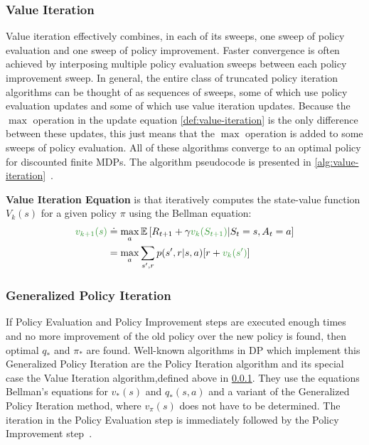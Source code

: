 \documentclass[../xlapes02]{subfiles}
\begin{document}
    \subsubsection{Value Iteration}\label{subsubsec:value-iteration}
    Value iteration effectively combines, in each of its sweeps, one sweep of policy evaluation and one sweep of policy improvement. Faster convergence is often achieved by interposing multiple policy evaluation sweeps between each policy improvement sweep. In general, the entire class of truncated policy iteration algorithms can be thought of as sequences of sweeps, some of which use policy evaluation updates and some of which use value iteration updates. Because the $\max$ operation in the update equation \cref{def:value-iteration} is the only difference between these updates, this just means that the $\max$ operation is added to some sweeps of policy evaluation. All of these algorithms converge to an optimal policy for discounted finite MDPs. The algorithm pseudocode is presented in \cref{alg:value-iteration}~\cite{sutton2018reinforcement}.

    \begin{definition}
        \label{def:value-iteration}
        \textbf{Value Iteration Equation} is that iteratively computes the state-value function $V_k(s)$ for a given policy $\pi$ using the Bellman equation:
        \begin{equation}
            \begin{split}
                \textcolor[RGB]{50,150,50}{v_{k+1}(s)}&\doteq\max_a\mathbb{E}\left[R_{t+1}+\gamma \textcolor[RGB]{50,150,50}{v_k(S_{t+1})}|S_t=s,A_t=a\right] \\
                &=\max_a\sum_{s',r}p(s',r|s,a)[r+\textcolor[RGB]{50,150,50}{v_k(s')}]
            \end{split}
        \end{equation}
    \end{definition}

    \subsubsection{Generalized Policy Iteration}\label{subsubsec:generalized-policy-iteration}
    If Policy Evaluation and Policy Improvement steps are executed enough times and no more improvement of the old policy over the new policy is found, then optimal $q_*$ and $\pi_*$ are found. Well-known algorithms in DP which implement this Generalized Policy Iteration are the Policy Iteration algorithm and its special case the Value Iteration algorithm,defined above in \cref{subsubsec:value-iteration}. They use the equations Bellman's equations for $v_*(s)$ and $q_*(s,a)$ and a variant of the Generalized Policy Iteration method, where $v_{\pi}(s)$ does not have to be determined. The iteration in the Policy Evaluation step is immediately followed by the Policy Improvement step~\cite{sutton2018reinforcement, 7110602}.
\end{document}

